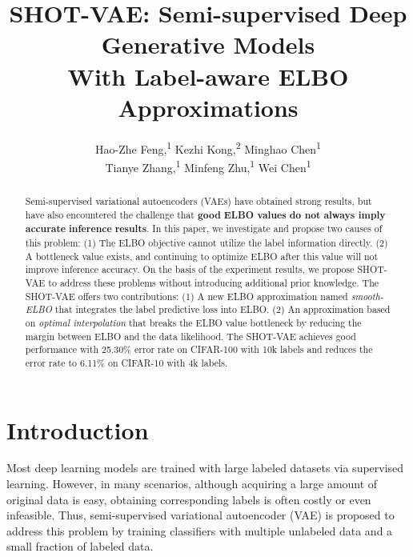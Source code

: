 \documentclass[letterpaper]{article}
\begin{document}
\title{SHOT-VAE: Semi-supervised Deep Generative Models \\ With Label-aware ELBO Approximations}
\author {
Hao-Zhe Feng,\textsuperscript{\rm 1}
        Kezhi Kong,\textsuperscript{\rm 2} 
        Minghao Chen\textsuperscript{\rm 1}\\
        Tianye Zhang,\textsuperscript{\rm 1}
        Minfeng Zhu,\textsuperscript{\rm 1}
        Wei Chen\textsuperscript{\rm 1} \\
}

\maketitle
\begin{abstract}
Semi-supervised variational autoencoders (VAEs) have obtained strong results, but have also encountered the challenge that \textbf{good} \textbf{ELBO values} \textbf{do not} \textbf{always imply} \textbf{accurate} \textbf{inference} \textbf{results}. In this paper, we investigate and propose two causes of this problem: (1) The ELBO objective cannot utilize the label information directly. (2) A bottleneck value exists, and continuing to optimize ELBO after this value will not improve inference accuracy. On the basis of the experiment results, we propose SHOT-VAE to address these problems without introducing additional prior knowledge. The SHOT-VAE offers two contributions: (1) A new ELBO approximation named \textit{smooth-ELBO} that integrates the label predictive loss into ELBO. (2) An approximation based on \textit{optimal interpolation} that breaks the ELBO value bottleneck by reducing the margin between ELBO and the data likelihood. The SHOT-VAE achieves good performance with 25.30\% error rate on CIFAR-100 with 10k labels and reduces the error rate to 6.11\% on CIFAR-10 with 4k labels. \end{abstract}
\section{Introduction}
Most deep learning models are trained with large labeled datasets via supervised learning. However, in many scenarios, although acquiring a large amount of original data is easy, obtaining corresponding labels is often costly or even infeasible. Thus, semi-supervised variational autoencoder (VAE) \citep{DBLP:conf/nips/KingmaMRW14} is proposed to address this problem by training classifiers with multiple unlabeled data and a small fraction of labeled data. 
\end{document}
